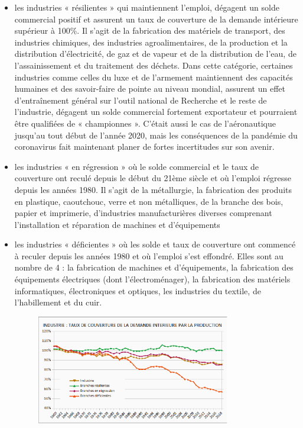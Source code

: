 \documentclass[a4paper]{article}
\begin{document}
\begin{itemize}
\item les industries « résilientes » qui maintiennent l’emploi, dégagent un solde commercial positif et assurent un taux de couverture de la demande intérieure supérieur à 100\%. Il s’agit de la fabrication des matériels de transport, des industries chimiques, des industries agroalimentaires, de la production et la distribution d’électricité, de gaz et de vapeur et de la distribution de l’eau, de l’assainissement et du traitement des déchets. Dans cette catégorie, certaines industries comme celles du luxe et de  l’armement maintiennent des capacités humaines et des savoir-faire de pointe au niveau mondial, assurent un effet d’entraînement général sur l’outil national de Recherche et le reste de l’industrie, dégagent un solde commercial fortement exportateur  et pourraient être qualifiées de « championnes ». C’était aussi le cas de l’aéronautique jusqu’au tout début de l’année 2020, mais les conséquences de la pandémie du coronavirus fait maintenant planer de fortes incertitudes sur son avenir.
 
\item les industries « en régression » où le solde commercial et le taux de couverture ont reculé depuis le début du 21ème siècle et où l’emploi régresse depuis les années 1980. Il s’agit de  la métallurgie, la fabrication des produits en plastique, caoutchouc, verre et non métalliques, de la branche des bois, papier et imprimerie, d’industries manufacturières diverses comprenant l’installation et réparation de machines et d’équipements 

\item les industries « déficientes » où les solde et taux de couverture ont commencé à reculer depuis les années 1980 et où l’emploi s’est effondré.  Elles sont au nombre de 4 : la fabrication de machines et d’équipements, la fabrication des équipements électriques (dont l’électroménager), la fabrication des matériels informatiques, électroniques et optiques, les industries du textile, de l’habillement et du cuir. 

\begin{figure}[H]
    \centering
    \includegraphics*[width=0.8\textwidth]{images/couverture2}
    \label{fig:couverture2}
\end{figure}



\end{itemize}
\end{document}
